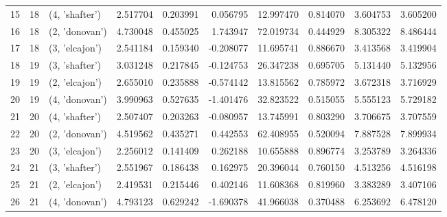 \begin{tabular}{lrlrrrrrrr}
15 &     18 &  (4, 'shafter') &  2.517704 &   0.203991 &  0.056795 &  12.997470 &  0.814070 &   3.604753 &  3.605200 \\
16 &     18 &  (2, 'donovan') &  4.730048 &   0.455025 &  1.743947 &  72.019734 &  0.444929 &   8.305322 &  8.486444 \\
17 &     18 &  (3, 'elcajon') &  2.541184 &   0.159340 & -0.208077 &  11.695741 &  0.886670 &   3.413568 &  3.419904 \\
18 &     19 &  (3, 'shafter') &  3.031248 &   0.217845 & -0.124753 &  26.347238 &  0.695705 &   5.131440 &  5.132956 \\
19 &     19 &  (2, 'elcajon') &  2.655010 &   0.235888 & -0.574142 &  13.815562 &  0.785972 &   3.672318 &  3.716929 \\
20 &     19 &  (4, 'donovan') &  3.990963 &   0.527635 & -1.401476 &  32.823522 &  0.515055 &   5.555123 &  5.729182 \\
21 &     20 &  (4, 'shafter') &  2.507407 &   0.203263 & -0.080957 &  13.745991 &  0.803290 &   3.706675 &  3.707559 \\
22 &     20 &  (2, 'donovan') &  4.519562 &   0.435271 &  0.442553 &  62.408955 &  0.520094 &   7.887528 &  7.899934 \\
23 &     20 &  (3, 'elcajon') &  2.256012 &   0.141409 &  0.262188 &  10.655888 &  0.896774 &   3.253789 &  3.264336 \\
24 &     21 &  (3, 'shafter') &  2.551967 &   0.186438 &  0.162975 &  20.396044 &  0.760150 &   4.513256 &  4.516198 \\
25 &     21 &  (2, 'elcajon') &  2.419531 &   0.215446 &  0.402146 &  11.608368 &  0.819960 &   3.383289 &  3.407106 \\
26 &     21 &  (4, 'donovan') &  4.793123 &   0.629242 & -1.690378 &  41.966038 &  0.370488 &   6.253692 &  6.478120 \\
\bottomrule
\end{tabular}
